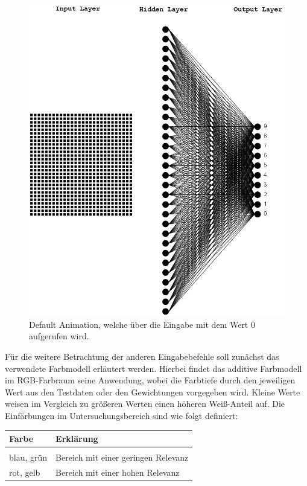 \begin{figure}[!hbt]
	\centering
	\includegraphics[scale=0.75]{Bilder/animation_network_default}
	\caption{Default Animation, welche über die Eingabe mit dem Wert $0$ aufgerufen wird.} 
	\label{fig:animation_network_default} 
\end{figure}
 
\noindent
Für die weitere Betrachtung der anderen Eingabebefehle soll zunächst das verwendete Farbmodell erläutert werden. Hierbei findet das additive Farbmodell im RGB-Farbraum seine Anwendung, wobei die Farbtiefe durch den jeweiligen Wert aus den Testdaten oder den Gewichtungen vorgegeben wird. Kleine Werte weisen im Vergleich zu größeren Werten einen höheren Weiß-Anteil auf. Die Einfärbungen im Untersuchungsbereich sind wie folgt definiert:
\begin{center}
\begin{tabular}{lp{6cm}}
\textbf{Farbe}   & \textbf{Erklärung} \\
\hline \\
blau, grün & Bereich mit einer geringen Relevanz \\[0.2cm]
rot, gelb  & Bereich mit einer hohen Relevanz   \\
\end{tabular}
\end{center} 
\vspace{1cm}

